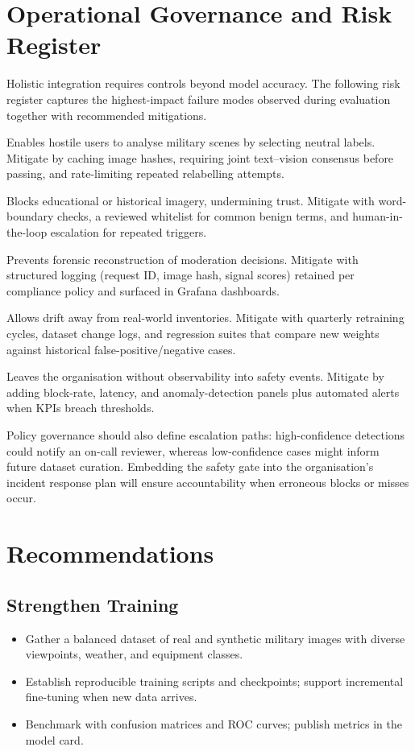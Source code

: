 \documentclass[conference]{IEEEtran}
\begin{document}
\section{Operational Governance and Risk Register}
Holistic integration requires controls beyond model accuracy. The following risk register captures the highest-impact failure modes observed during evaluation together with recommended mitigations.
\begin{description}[leftmargin=0.23\columnwidth,labelindent=0pt]
  \item[Bypass via relabelling] Enables hostile users to analyse military scenes by selecting neutral labels. Mitigate by caching image hashes, requiring joint text--vision consensus before passing, and rate-limiting repeated relabelling attempts.
  \item[False positives on benign content] Blocks educational or historical imagery, undermining trust. Mitigate with word-boundary checks, a reviewed whitelist for common benign terms, and human-in-the-loop escalation for repeated triggers.
  \item[Lack of audit trail] Prevents forensic reconstruction of moderation decisions. Mitigate with structured logging (request ID, image hash, signal scores) retained per compliance policy and surfaced in Grafana dashboards.
  \item[Stale model weights] Allows drift away from real-world inventories. Mitigate with quarterly retraining cycles, dataset change logs, and regression suites that compare new weights against historical false-positive/negative cases.
  \item[Operational blind spots] Leaves the organisation without observability into safety events. Mitigate by adding block-rate, latency, and anomaly-detection panels plus automated alerts when KPIs breach thresholds.
\end{description}

Policy governance should also define escalation paths: high-confidence detections could notify an on-call reviewer, whereas low-confidence cases might inform future dataset curation. Embedding the safety gate into the organisation's incident response plan will ensure accountability when erroneous blocks or misses occur.

\section{Recommendations}
\subsection{Strengthen Training}
\begin{itemize}[leftmargin=*]
  \item Gather a balanced dataset of real and synthetic military images with diverse viewpoints, weather, and equipment classes.
  \item Establish reproducible training scripts and checkpoints; support incremental fine-tuning when new data arrives.
  \item Benchmark with confusion matrices and ROC curves; publish metrics in the model card.
\end{itemize}
\end{document}
